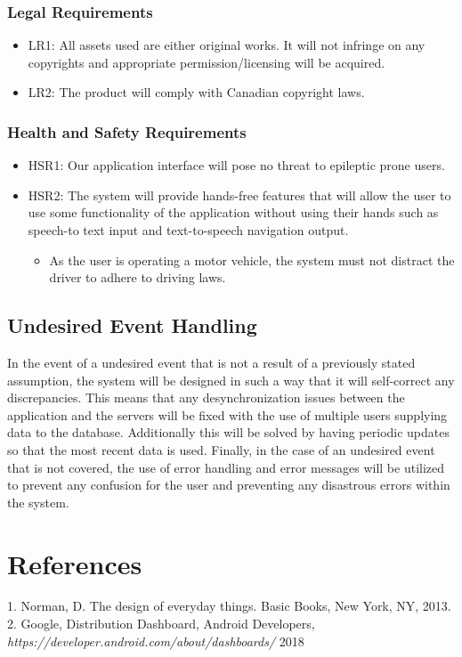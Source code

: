 \documentclass[]{article}
\begin{document}
\subsubsection{Legal Requirements}
\begin{itemize}
	\item LR1: All assets used are either original works. It will not infringe on any copyrights and appropriate permission/licensing will be acquired.
	\item LR2: The product will comply with Canadian copyright laws.
\end{itemize}

\subsubsection{Health and Safety Requirements}
\begin{itemize}
	\item HSR1: Our application interface will pose no threat to epileptic prone users.
	
	\item HSR2: The system will provide hands-free features that will allow the user to use some functionality of the application without using their hands such as speech-to text input and text-to-speech navigation output.
	\begin{itemize}
		\item As the user is operating a motor vehicle, the system must not distract the driver to adhere to driving laws.
	\end{itemize}
\end{itemize}

\subsection{Undesired Event Handling}
In the event of a undesired event that is not a result of a previously stated assumption, the system will be designed in such a way that it will self-correct any discrepancies. This means that any desynchronization issues between the application and the servers will be fixed with the use of multiple users supplying data to the database. Additionally this will be solved by having periodic updates so that the most recent data is used. Finally, in the case of an undesired event that is not covered, the use of error handling and error messages will be utilized to prevent any confusion for the user and preventing any disastrous errors within the system. 
\section{References} 
1. Norman, D. The design of everyday things. Basic Books, New York, NY, 2013.\\
2. Google, Distribution Dashboard, Android Developers, \textit{https://developer.android.com/about/dashboards/} 2018
\end{document}
